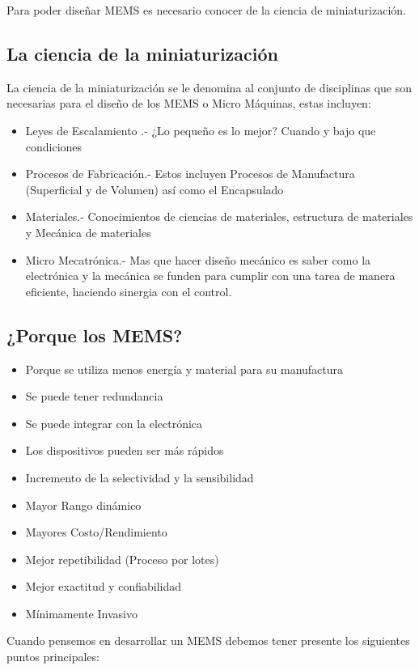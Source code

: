 \documentclass[12pt]{book}
\theoremstyle{definition}
\theoremstyle{remark}
\theoremstyle{plain}
\begin{document}
Para poder diseñar MEMS es necesario conocer de la ciencia de miniaturización.

\subsection{La ciencia de la miniaturización}
La ciencia de la miniaturización se le denomina al conjunto de disciplinas que son necesarias para el diseño de los MEMS o Micro Máquinas, estas incluyen:

\begin{itemize}
\item Leyes de Escalamiento .- ¿Lo pequeño es lo mejor? Cuando y bajo que condiciones
\item Procesos de Fabricación.- Estos incluyen Procesos de Manufactura (Superficial y de Volumen) así como el  Encapsulado
\item Materiales.- Conocimientos de ciencias de materiales, estructura de materiales y Mecánica de materiales
\item Micro Mecatrónica.- Mas que hacer diseño mecánico es saber como la electrónica y la mecánica se funden para cumplir con una tarea de manera eficiente, haciendo sinergia con el control.
\end{itemize}

\subsection{¿Porque los MEMS?}

\begin{itemize}
\item Porque se utiliza menos energía y material para su manufactura
\item Se puede tener redundancia
\item Se puede integrar con la electrónica
\item Los dispositivos pueden ser más rápidos
\item Incremento de la selectividad y la sensibilidad
\item Mayor Rango dinámico
\item Mayores Costo/Rendimiento
\item Mejor repetibilidad (Proceso por lotes)
\item Mejor exactitud y confiabilidad
\item Mínimamente Invasivo
\end{itemize}

Cuando pensemos en desarrollar un MEMS debemos tener presente los siguientes puntos principales:
\end{document}
